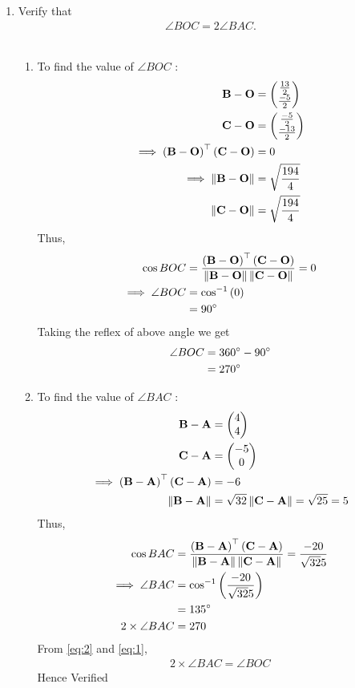 \documentclass[11pt]{book}
\begin{document}
\begin{enumerate}[label=\thesection.\arabic*.,ref=\thesection.\theenumi]
\item Verify that 
\begin{align}
\angle BOC = 2\angle BAC.
\end{align}\\
 \solution
\begin{enumerate}
\item To find  the value of $\angle{BOC}$ :
\begin{align}
\mathbf{B}-\mathbf{O}
          &=\begin{pmatrix}\frac{13}{2}\\\frac{-5}{2}\end{pmatrix} \\
\mathbf{C}-\mathbf{O}
         & =\begin{pmatrix}\frac{-5}{2}\\\frac{-13}{2}\end{pmatrix}
	  \\
\implies \left(\mathbf{B}-\mathbf{O}\right)^{\top}\left(\mathbf{C}-\mathbf{O}\right)&=0\\
	\implies \left\lVert\mathbf{B}-\mathbf{O}\right\rVert&= \sqrt{\frac{194}{4}}\\
	\left\lVert\mathbf{C}-\mathbf{O}\right\rVert &= \sqrt{\frac{194}{4}}
\end{align}
Thus,
\begin{align}
\cos{BOC}&=\frac{\left(\mathbf{B}-\mathbf{O}\right)^{\top}\left(\mathbf{C}-\mathbf{O}\right)}{\left\lVert\mathbf{B}-\mathbf{O}\right\rVert\left\lVert\mathbf{C}-\mathbf{O}\right\rVert}
=0\\
\implies\angle{BOC}&=\cos^{-1}\left(0\right)
\\
	&=90\degree
\end{align}
Taking the reflex of above angle we get 
\begin{align}
    \angle{BOC}&=360\degree-90\degree \\
    &= 270\degree
\end{align}
	\item To find  the value of $\angle{BAC}$ :
\begin{align}
\mathbf{B}-\mathbf{A}&=\begin{pmatrix}4\\4\end{pmatrix} \\
\mathbf{C}-\mathbf{A}&=\begin{pmatrix}-5\\0\end{pmatrix}
\\
\implies \left(\mathbf{B}-\mathbf{A}\right)^{\top}\left(\mathbf{C}-\mathbf{A}\right)&=-6
\\
	\left\lVert\mathbf{B}-\mathbf{A}\right\rVert&= \sqrt{32}
	\left\lVert\mathbf{C}-\mathbf{A}\right\rVert= \sqrt{25}=5
\end{align}
Thus,
\begin{align}
\cos{BAC}&=\frac{\brak{\vec{B}-\vec{A}}^{\top}\brak{\vec{C}-\vec{A}}}{\norm{\vec{B}-\vec{A}}\norm{\vec{C}-\vec{A}}}
=\frac{-20}{\sqrt{32} 5}\\
\implies\angle{BAC}&=\cos^{-1}\brak{\frac{-20}{\sqrt{32} 5}}\\
&=135\degree \label{eq:2}  \\
2\times\angle{BAC} &= 270
\end{align}
From \eqref{eq:2} and \eqref{eq:1},
\begin{align}
2\times\angle{BAC}
= \angle{BOC}
\end{align}
Hence Verified
\end{enumerate}


\end{enumerate}
\end{document}
